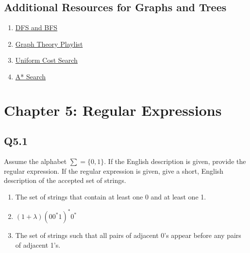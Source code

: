 \documentclass{article}
\begin{document}
\subsection*{Additional Resources for Graphs and Trees}
\begin{enumerate}
    \item \href{https://www.youtube.com/watch?v=zaBhtODEL0w}{DFS and BFS}
    \item \href{https://www.youtube.com/watch?v=DgXR2OWQnLc&list=PLDV1Zeh2NRsDGO4--qE8yH72HFL1Km93P}{Graph Theory Playlist}
    \item \href{https://www.youtube.com/watch?v=dRMvK76xQJI}{Uniform Cost Search}
    \item \href{https://www.youtube.com/watch?v=6TsL96NAZCo}{A* Search}
\end{enumerate}
\newpage
{}
\section*{Chapter 5: Regular Expressions}
\subsection*{Q5.1}
Assume the alphabet $\sum=\{0,1\}$. If the English description is given, provide the regular expression. If the regular expression is given, give a short, English description of the accepted set of strings.
\begin{enumerate}[label=\alph*.]
    \item The set of strings that contain at least one 0 and at least one 1.
    \item $(1+\lambda)(00^*1)^*0^*$
    \item The set of strings such that all pairs of adjacent 0's appear before any pairs of adjacent 1's.
\end{enumerate}
\newpage
{}
\end{document}

